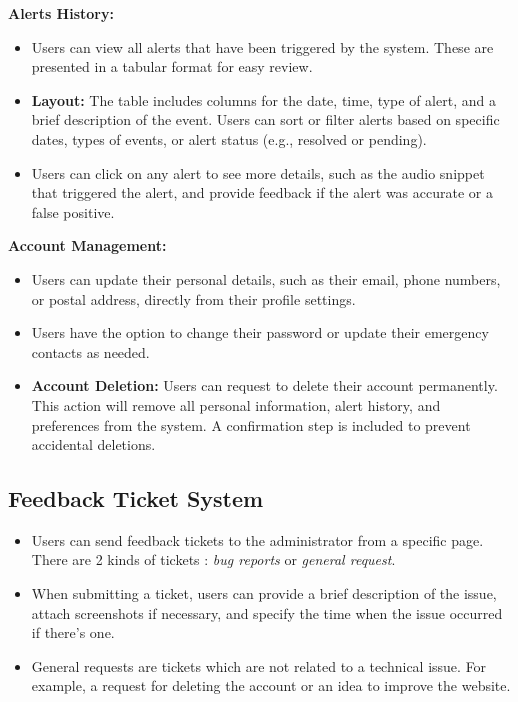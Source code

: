 \documentclass[conference]{IEEEtran}
\begin{document}
\textbf{Alerts History:}
\begin{itemize}
    \item Users can view all alerts that have been triggered by the system. These are presented in a tabular format for easy review.
    \item \textbf{Layout:} The table includes columns for the date, time, type of alert, and a brief description of the event. Users can sort or filter alerts based on specific dates, types of events, or alert status (e.g., resolved or pending).
    \item Users can click on any alert to see more details, such as the audio snippet that triggered the alert, and provide feedback if the alert was accurate or a false positive.
\end{itemize}

\textbf{Account Management:}
\begin{itemize}
    \item Users can update their personal details, such as their email, phone numbers, or postal address, directly from their profile settings.
    \item Users have the option to change their password or update their emergency contacts as needed.
    \item \textbf{Account Deletion:} Users can request to delete their account permanently. This action will remove all personal information, alert history, and preferences from the system. A confirmation step is included to prevent accidental deletions.
\end{itemize}

\subsection{Feedback Ticket System}
\begin{itemize}
    \item Users can send feedback tickets to the administrator from a specific page. There are 2 kinds of tickets : \textit{bug reports} or \textit{general request}.
    \item When submitting a ticket, users can provide a brief description of the issue, attach screenshots if necessary, and specify the time when the issue occurred if there's one.
    \item General requests are tickets which are not related to a technical issue. For example, a request for deleting the account or an idea to improve the website.
\end{itemize}
\end{document}
